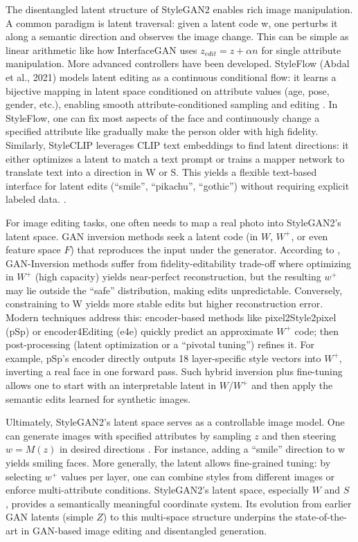 The disentangled latent structure of StyleGAN2 enables rich image manipulation. 
A common paradigm is latent traversal: given a latent code w, one perturbs it along a 
semantic direction and observes the image change. 
This can be simple as linear arithmetic like how InterfaceGAN uses $z_{edit} = z + \alpha n$ for single attribute manipulation.
More advanced controllers have been developed. StyleFlow (Abdal et al., 2021) 
models latent editing as a continuous conditional flow: it learns a bijective mapping 
in latent space conditioned on attribute values (age, pose, gender, etc.), 
enabling smooth attribute-conditioned sampling and editing \citep{Abdal_2021}.
In StyleFlow, one can fix most aspects of the face and continuously change a specified attribute like gradually make the person
older with high fidelity.
Similarly, StyleCLIP leverages CLIP text embeddings 
to find latent directions: it either optimizes a latent to match a text prompt 
or trains a mapper network to translate text into a direction in W or S. 
This yields a flexible text-based interface for latent edits (“smile”, “pikachu”, “gothic”) without requiring explicit labeled data. \citep{patashnik2021stylecliptextdrivenmanipulationstylegan}.

For image editing tasks, one often needs to map a real photo into StyleGAN2's latent space. 
GAN inversion methods seek a latent code (in $W$, $W^+$, or even feature space $F$) that reproduces the input under the generator. 
According to \citet{liu2023delvingstyleganinversionimage}, GAN-Inversion methods suffer from fidelity-editability trade-off where 
optimizing in $W^+$ (high capacity) yields near-perfect reconstruction, 
but the resulting $w^+$ may lie outside the “safe” distribution, making edits unpredictable.
Conversely, constraining to W yields more stable edits but higher reconstruction error. 
Modern techniques address this: encoder-based methods like pixel2Style2pixel (pSp) \citep{richardson2021encodingstylestyleganencoder}
or encoder4Editing (e4e) \citep{tov2021designingencoderstyleganimage} quickly predict an approximate $W^+$ code; then post-processing (latent optimization or a “pivotal tuning”) refines it.
For example, pSp's encoder directly outputs 18 layer-specific style vectors into $W^+$, inverting a real face in one forward pass.
Such hybrid inversion plus fine-tuning allows one to start with an interpretable latent in 
$W$/$W^+$ and then apply the semantic edits learned for synthetic images.

Ultimately, StyleGAN2's latent space serves as a controllable image model. 
One can generate images with specified attributes by sampling $z$ and then steering $w = M(z)$ in desired directions \citep{patashnik2021stylecliptextdrivenmanipulationstylegan}.
For instance, adding a “smile” direction to w yields smiling faces.
More generally, the latent allows fine-grained tuning: by selecting $w^+$ values per layer, 
one can combine styles from different images or enforce multi-attribute conditions. 
StyleGAN2's latent space, especially $W$ and $S$ , provides a semantically meaningful coordinate system. 
Its evolution from earlier GAN latents (simple $Z$) to this multi-space structure underpins 
the state-of-the-art in GAN-based image editing and disentangled generation.
